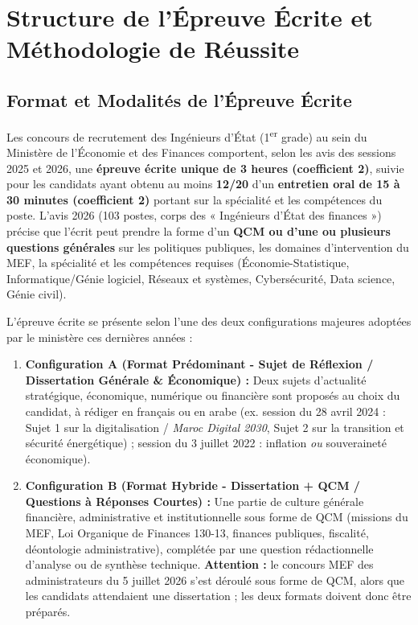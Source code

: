 \chapter{Structure de l'Épreuve Écrite et Méthodologie de Réussite}

\section{Format et Modalités de l'Épreuve Écrite}
Les concours de recrutement des Ingénieurs d'État (1\textsuperscript{er} grade) au sein du Ministère de l'Économie et des Finances comportent, selon les avis des sessions 2025 et 2026, une \textbf{épreuve écrite unique de 3 heures (coefficient 2)}, suivie pour les candidats ayant obtenu au moins \textbf{12/20} d'un \textbf{entretien oral de 15 à 30 minutes (coefficient 2)} portant sur la spécialité et les compétences du poste. L'avis 2026 (103 postes, corps des « Ingénieurs d'État des finances ») précise que l'écrit peut prendre la forme d'un \textbf{QCM ou d'une ou plusieurs questions générales} sur les politiques publiques, les domaines d'intervention du MEF, la spécialité et les compétences requises (Économie-Statistique, Informatique/Génie logiciel, Réseaux et systèmes, Cybersécurité, Data science, Génie civil).

L'épreuve écrite se présente selon l'une des deux configurations majeures adoptées par le ministère ces dernières années :
\begin{enumerate}
    \item \textbf{Configuration A (Format Prédominant - Sujet de Réflexion / Dissertation Générale \& Économique) :}
    Deux sujets d'actualité stratégique, économique, numérique ou financière sont proposés au choix du candidat, à rédiger en français ou en arabe (ex. session du 28 avril 2024 : Sujet 1 sur la digitalisation / \textit{Maroc Digital 2030}, Sujet 2 sur la transition et sécurité énergétique) ; session du 3 juillet 2022 : inflation \textit{ou} souveraineté économique).
    \item \textbf{Configuration B (Format Hybride - Dissertation + QCM / Questions à Réponses Courtes) :}
    Une partie de culture générale financière, administrative et institutionnelle sous forme de QCM (missions du MEF, Loi Organique de Finances 130-13, finances publiques, fiscalité, déontologie administrative), complétée par une question rédactionnelle d'analyse ou de synthèse technique. \textbf{Attention :} le concours MEF des administrateurs du 5 juillet 2026 s'est déroulé sous forme de QCM, alors que les candidats attendaient une dissertation ; les deux formats doivent donc être préparés.
\end{enumerate}

